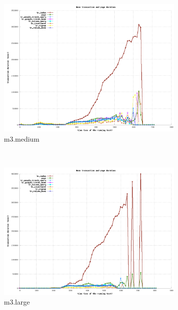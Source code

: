 \documentclass[dvips,12pt]{article}
\begin{document}
\begin{figure}[h!]
    \centering
    \begin{subfigure}[b]{0.3\textwidth}
        \includegraphics[width=\textwidth]{images/transaction_medium.png}
        \caption{m3.medium}
    \end{subfigure}
    ~ 
    \begin{subfigure}[b]{0.3\textwidth}
        \includegraphics[width=\textwidth]{images/transaction_large.png}
        \caption{m3.large}
    \end{subfigure}
    ~ 
    \begin{subfigure}[b]{0.3\textwidth}

\end{subfigure}
\end{figure}
\end{document}
